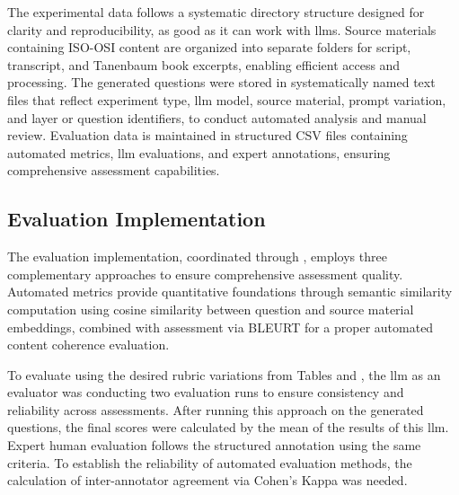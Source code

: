 The experimental data follows a systematic directory structure designed for clarity and reproducibility, as good as it can work with \ac{llms}. Source materials containing ISO-OSI content are organized into separate folders for script, transcript, and Tanenbaum book excerpts, enabling efficient access and processing. The generated questions were stored in systematically named text files that reflect experiment type, \ac{llm} model, source material, prompt variation, and layer or question identifiers, to conduct automated analysis and manual review. Evaluation data is maintained in structured CSV files containing automated metrics, \ac{llm} evaluations, and expert annotations, ensuring comprehensive assessment capabilities.

\subsection{Evaluation Implementation}

The evaluation implementation, coordinated through , employs three complementary approaches to ensure comprehensive assessment quality. Automated metrics provide quantitative foundations through semantic similarity computation using cosine similarity between question and source material embeddings, combined with assessment via BLEURT for a proper automated content coherence evaluation.

\pagebreak

To evaluate using the desired rubric variations from Tables  and , the \ac{llm} as an evaluator was conducting two evaluation runs to ensure consistency and reliability across assessments. After running this approach on the generated questions, the final scores were calculated by the mean of the results of this \ac{llm}. Expert human evaluation follows the structured annotation using the same criteria. To establish the reliability of automated evaluation methods, the calculation of inter-annotator agreement via Cohen's Kappa was needed. 


